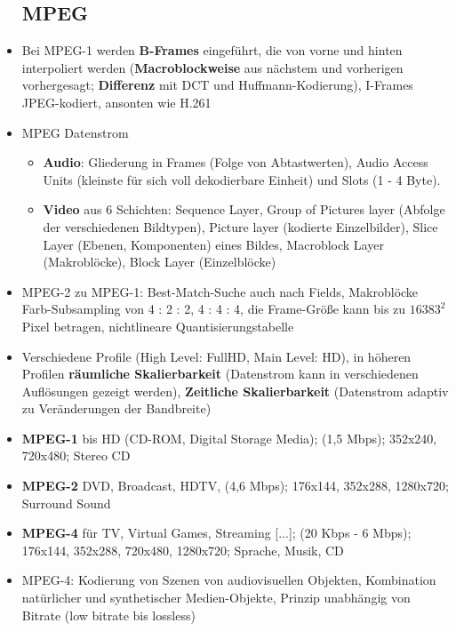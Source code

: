 \documentclass[12pt,landscape]{article}
\begin{document}
\begin{multicols}{3}
\begin{itemize}
\subsection{MPEG}
\item Bei MPEG-1 werden \textbf{B-Frames} eingeführt, die von vorne und hinten interpoliert werden (\textbf{Macroblockweise} aus nächstem und vorherigen vorhergesagt; \textbf{Differenz} mit DCT und Huffmann-Kodierung), I-Frames JPEG-kodiert, ansonten wie H.261
\item MPEG Datenstrom
\begin{itemize}
    \item \textbf{Audio}: Gliederung in Frames (Folge von Abtastwerten), Audio Access Units (kleinste für sich voll dekodierbare Einheit) und Slots (1 - 4 Byte).
    \item \textbf{Video} aus 6 Schichten: Sequence Layer, Group of Pictures layer (Abfolge der verschiedenen Bildtypen), Picture layer (kodierte Einzelbilder), Slice Layer (Ebenen, Komponenten) eines Bildes, Macroblock Layer (Makroblöcke), Block Layer (Einzelblöcke)
\end{itemize}
\item MPEG-2 zu MPEG-1: Best-Match-Suche auch nach Fields, Makroblöcke Farb-Subsampling von 4 : 2 : 2, 4 : 4 : 4, die Frame-Größe kann bis zu $16383^2$ Pixel betragen, nichtlineare Quantisierungstabelle
\item Verschiedene Profile (High Level: FullHD, Main Level: HD), in höheren Profilen \textbf{räumliche Skalierbarkeit} (Datenstrom kann in verschiedenen Auflösungen gezeigt werden), \textbf{Zeitliche Skalierbarkeit} (Datenstrom adaptiv zu Veränderungen der Bandbreite)
\item \textbf{MPEG-1} bis HD (CD-ROM, Digital Storage Media); (1,5 Mbps); 352x240, 720x480; Stereo CD 
\item \textbf{MPEG-2} DVD, Broadcast, HDTV, (4,6 Mbps); 176x144, 352x288, 1280x720; Surround Sound
\item \textbf{MPEG-4} für TV, Virtual Games, Streaming [...]; (20 Kbps - 6 Mbps); 176x144, 352x288, 720x480, 1280x720; Sprache, Musik, CD
\item MPEG-4: Kodierung von Szenen von audiovisuellen Objekten, Kombination natürlicher und synthetischer Medien-Objekte, Prinzip unabhängig von Bitrate (low bitrate bis lossless)
\end{itemize}

\end{multicols}
\end{document}
